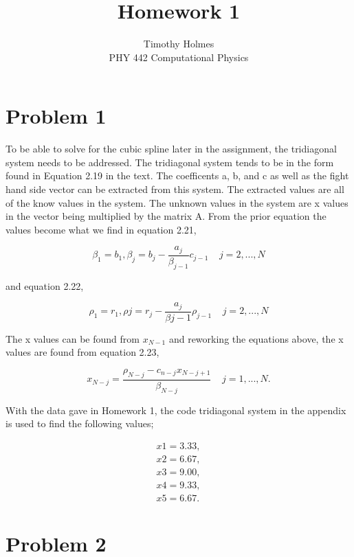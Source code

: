 \documentclass[12pt]{article}
\begin{document}
 
 
\title{Homework 1}
\author{Timothy Holmes\\ %
PHY 442 Computational Physics}

\maketitle

\section*{Problem 1}

To be able to solve for the cubic spline later in the assignment, the tridiagonal system needs to be addressed. The tridiagonal system tends to be in the form found in Equation 2.19 in the text. The coefficents a, b, and c as well as the fight hand side vector can be extracted from this system. The extracted values are all of the know values in the system. The unknown values in the system are x values in the vector being multiplied by the matrix A. From the prior equation the values become what we find in equation 2.21,

$$
\beta_{1} = b_{1}, \beta_{j} = b_{j} - \frac{a_{j}}{\beta_{j - 1}}c_{j - 1} \;\;\;\; j = 2,...,N 
$$

and equation 2.22,

$$
\rho_{1} = r_{1}, \rho{j} = r_{j} - \frac{a_{j}}{\beta{j - 1}}\rho_{j - 1} \;\;\;\; j = 2,...,N 
$$

The x values can be found from $x_{N - 1}$ and reworking the equations above, the x values are found from equation 2.23,

$$
x_{N - j} = \frac{\rho_{N - j} - c_{n - j}x_{N - j + 1}}{\beta_{N - j}} \;\;\;\; j = 1,...,N.
$$

With the data gave in Homework 1, the code tridiagonal system in the appendix is used to find the following values;

\begin{align*}
x1 = 3.33, \\
x2 = 6.67, \\
x3 = 9.00, \\
x4 = 9.33, \\
x5 = 6.67.
\end{align*}

\section*{Problem 2}
\end{document}
